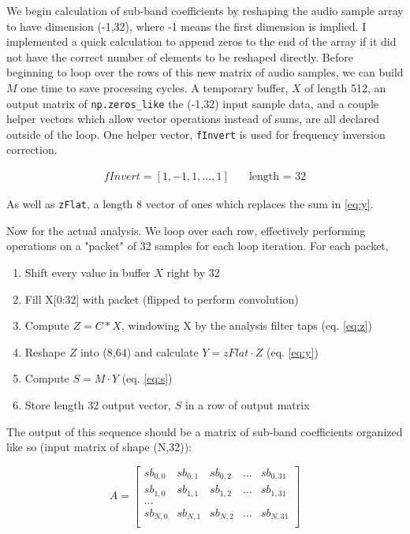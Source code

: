 \documentclass[11pt,a4paper]{article}
\begin{document}
\clearpage

We begin calculation of sub-band coefficients by reshaping the audio sample array to have dimension (-1,32), where -1 means the first dimension is implied. I implemented a quick calculation to append zeros to the end of the array if it did not have the correct number of elements to be reshaped directly. Before beginning to loop over the rows of this new matrix of audio samples, we can build $M$ one time to save processing cycles. A temporary buffer, $X$ of length 512, an output matrix of \verb|np.zeros_like| the (-1,32) input sample data, and a couple helper vectors which allow vector operations instead of sums, are all declared outside of the loop. One helper vector, \verb|fInvert| is used for frequency inversion correction. 

\begin{align*}
fInvert = [1, -1, 1, \ldots, 1] \quad &\text{length = } 32
\end{align*}

As well as \verb|zFlat|, a length 8 vector of ones which replaces the sum in \eqref{eq:y}.

Now for the actual analysis. We loop over each row, effectively performing operations on a "packet" of 32 samples for each loop iteration. For each packet,

\begin{enumerate}
\item Shift every value in buffer $X$ right by 32
\item Fill X[0:32] with packet (flipped to perform convolution)
\item Compute $Z = C * X$, windowing X by the analysis filter taps (eq. \eqref{eq:z})
\item Reshape $Z$ into (8,64) and calculate $Y = zFlat \cdot Z$ (eq. \eqref{eq:y})
\item Compute $S = M \cdot Y$ (eq. \eqref{eq:s})
\item Store length 32 output vector, $S$ in a row of output matrix
\end{enumerate}

The output of this sequence should be a matrix of sub-band coefficients organized like so (input matrix of shape (N,32)):

\begin{equation}
A = 
	\begin{bmatrix}
		sb_{0,0} & sb_{0,1} & sb_{0,2} & \ldots & sb_{0,31} \\
		sb_{1,0} & sb_{1,1} & sb_{1,2} & \ldots & sb_{1,31} \\
		\ldots \\
		sb_{N,0} & sb_{N,1} & sb_{N,2} & \ldots & sb_{N,31} \\
	\end{bmatrix}
\end{equation}
\end{document}
